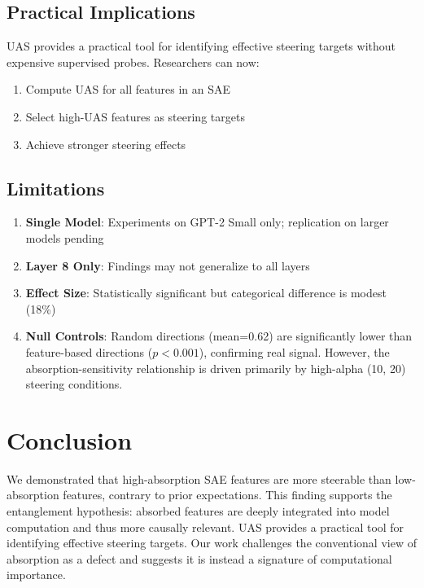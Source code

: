 \documentclass{article}
\begin{document}
\subsection{Practical Implications}

UAS provides a practical tool for identifying effective steering targets without expensive supervised probes. Researchers can now:
\begin{enumerate}
    \item Compute UAS for all features in an SAE
    \item Select high-UAS features as steering targets
    \item Achieve stronger steering effects
\end{enumerate}

\subsection{Limitations}

\begin{enumerate}
    \item \textbf{Single Model}: Experiments on GPT-2 Small only; replication on larger models pending
    \item \textbf{Layer 8 Only}: Findings may not generalize to all layers
    \item \textbf{Effect Size}: Statistically significant but categorical difference is modest (18\%)
    \item \textbf{Null Controls}: Random directions (mean=0.62) are significantly lower than feature-based directions ($p<0.001$), confirming real signal. However, the absorption-sensitivity relationship is driven primarily by high-alpha (10, 20) steering conditions.
\end{enumerate}


\section{Conclusion}

We demonstrated that high-absorption SAE features are more steerable than low-absorption features, contrary to prior expectations. This finding supports the entanglement hypothesis: absorbed features are deeply integrated into model computation and thus more causally relevant. UAS provides a practical tool for identifying effective steering targets. Our work challenges the conventional view of absorption as a defect and suggests it is instead a signature of computational importance.




\end{document}
